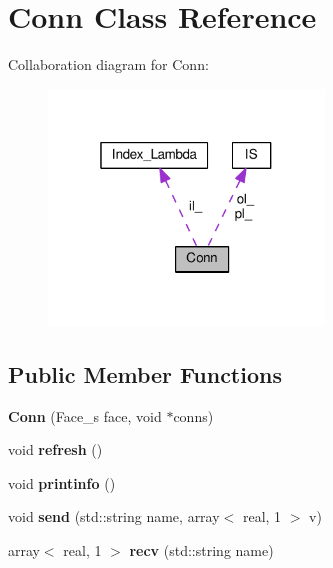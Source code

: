 \hypertarget{classConn}{\section{Conn Class Reference}
\label{classConn}
}


Collaboration diagram for Conn\+:\nopagebreak
\begin{figure}[H]
\begin{center}
\leavevmode
\includegraphics[width=208pt]{classConn__coll__graph}
\end{center}
\end{figure}
\subsection*{Public Member Functions}
\begin{DoxyCompactItemize}
\item 
\hypertarget{classConn_ab0ba4fbd67bc99991f2110c3ca80ca3d}{{\bfseries Conn} (Face\+\_\+s face, void $\ast$conns)}\label{classConn_ab0ba4fbd67bc99991f2110c3ca80ca3d}

\item 
\hypertarget{classConn_af3776731e374e856bb5eac3faea03ae3}{void {\bfseries refresh} ()}\label{classConn_af3776731e374e856bb5eac3faea03ae3}

\item 
\hypertarget{classConn_add96cc92a7575634f44220cb6e2e2421}{void {\bfseries printinfo} ()}\label{classConn_add96cc92a7575634f44220cb6e2e2421}

\item 
\hypertarget{classConn_ace36b6085ceadcfa9654b5950e7719c0}{void {\bfseries send} (std\+::string name, array$<$ real, 1 $>$ v)}\label{classConn_ace36b6085ceadcfa9654b5950e7719c0}

\item 
\hypertarget{classConn_a5f149a3217d7cf6227b48571638cadf8}{array$<$ real, 1 $>$ {\bfseries recv} (std\+::string name)}\label{classConn_a5f149a3217d7cf6227b48571638cadf8}

\end{DoxyCompactItemize}
